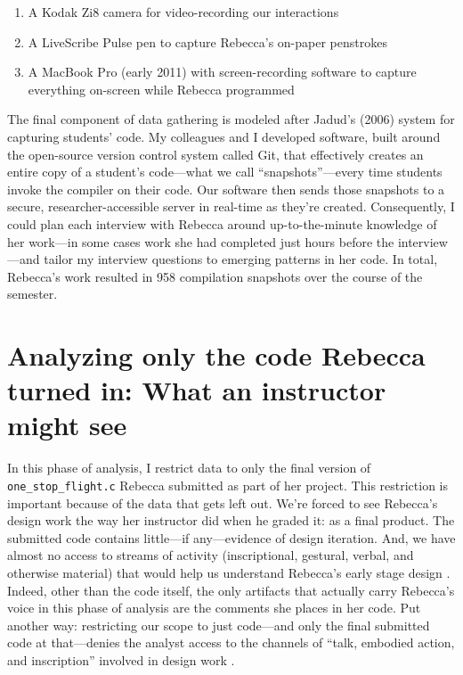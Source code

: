 \begin{enumerate}
\def\labelenumi{\arabic{enumi}.}
\tightlist
\item
  A Kodak Zi8 camera for video-recording our interactions
\item
  A LiveScribe Pulse pen to capture Rebecca's on-paper penstrokes
\item
  A MacBook Pro (early 2011) with screen-recording software to capture
  everything on-screen while Rebecca programmed
\end{enumerate}

The final component of data gathering is modeled after Jadud's (2006)
system for capturing students' code. My colleagues and I developed
software, built around the open-source version control system called
Git, that effectively creates an entire copy of a student's code---what
we call ``snapshots''---every time students invoke the compiler on their
code. Our software then sends those snapshots to a secure,
researcher-accessible server in real-time as they're created.
Consequently, I could plan each interview with Rebecca around
up-to-the-minute knowledge of her work---in some cases work she had
completed just hours before the interview---and tailor my interview
questions to emerging patterns in her code. In total, Rebecca's work
resulted in 958 compilation snapshots over the course of the semester.

\section{Analyzing only the code Rebecca turned in: What an instructor might see}\label{analyzing-only-the-code-rebecca-turned-in-what-an-instructor-might-see}

In this phase of analysis, I restrict data to only the final version of \texttt{one\_stop\_flight.c} Rebecca submitted as part of her project. This restriction is important because of the data that gets left out. We're forced to see Rebecca's design work the way her instructor did when he graded it: as a final product. The submitted code contains little---if any---evidence of design iteration. And, we have almost no access to streams of activity (inscriptional, gestural, verbal, and otherwise material) that would help us understand Rebecca's early stage design \citep{petre_software_2014}. Indeed, other than the code itself, the only artifacts that actually carry Rebecca's voice in this phase of analysis are the comments she places in her code. Put another way: restricting our scope to just code---and only the final submitted code at that---denies the analyst access to the channels of ``talk, embodied action, and inscription'' involved in design work \citep[ p.~179]{hall_disrupting_2002}.

